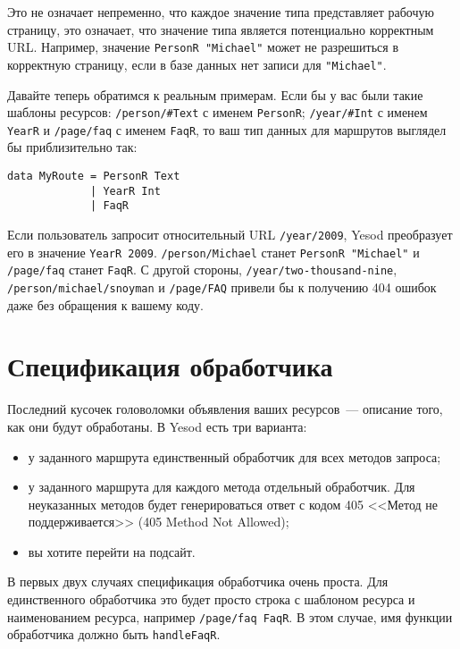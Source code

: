 \begin{minipage}[!h]{.9\linewidth}
Это не означает непременно, что каждое значение типа представляет
рабочую страницу, это означает, что значение типа является потенциально
корректным URL. Например, значение \lstinline!PersonR "Michael"! может
не разрешиться в корректную страницу, если в базе данных нет записи для
\lstinline!"Michael"!.
\end{minipage}

Давайте теперь обратимся к реальным примерам. Если бы у вас были такие
шаблоны ресурсов: \lstinline!/person/#Text! с именем
\lstinline!PersonR!; \lstinline!/year/#Int! с именем
\lstinline!YearR! и \lstinline!/page/faq! с именем \lstinline!FaqR!,
то ваш тип данных для маршрутов выглядел бы приблизительно так:
\begin{lstlisting}
data MyRoute = PersonR Text
             | YearR Int
             | FaqR
\end{lstlisting}

Если пользователь запросит относительный URL \lstinline!/year/2009!,
Yesod преобразует его в значение \lstinline!YearR 2009!.
\lstinline!/person/Michael! станет \lstinline!PersonR "Michael"!
и \lstinline!/page/faq! станет \lstinline!FaqR!. С другой
стороны, \lstinline!/year/two-thousand-nine!,
\lstinline!/person/michael/snoyman! и \lstinline!/page/FAQ! привели бы
к получению 404 ошибок даже без обращения к вашему коду.

\section{Спецификация обработчика}
Последний кусочек головоломки объявления ваших ресурсов~--- описание
того, как они будут обработаны. В Yesod есть три варианта:
\begin{itemize}
\item у заданного маршрута единственный обработчик для всех методов запроса;
\item у заданного маршрута для каждого метода отдельный
  обработчик. Для неуказанных методов будет генерироваться ответ с
  кодом 405 <<Метод не поддерживается>> (405 Method Not
  Allowed);
\item вы хотите перейти на подсайт.
\end{itemize}

В первых двух случаях спецификация обработчика очень проста. Для
единственного обработчика это будет просто строка с шаблоном ресурса и
наименованием ресурса, например \lstinline!/page/faq FaqR!. В этом
случае, имя функции обработчика должно быть \lstinline!handleFaqR!.

